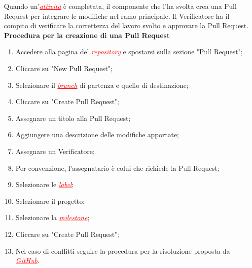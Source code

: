 Quando un'\textcolor{red}{\uline{\textit{attività}}} è completata, il componente che l'ha svolta crea una Pull Request per integrare le modifiche
nel ramo principale. Il Verificatore ha il compito di verificare la correttezza del lavoro svolto e approvare la Pull Request.
\textbf{Procedura per la creazione di una Pull Request} \label{pull_request}
\begin{enumerate}
    \item Accedere alla pagina del \textcolor{red}{\uline{\textit{repository}}} e spostarsi sulla sezione "Pull Request";
    \item Cliccare su "New Pull Request";
    \item Selezionare il \textcolor{red}{\uline{\textit{branch}}} di partenza e quello di destinazione;
    \item Cliccare su "Create Pull Request";
    \item Assegnare un titolo alla Pull Request;
    \item Aggiungere una descrizione delle modifiche apportate;
    \item Assegnare un Verificatore;
    \item Per convenzione, l'assegnatario è colui che richiede la Pull Request;
    \item Selezionare le \textcolor{red}{\uline{\textit{label}}};
    \item Selezionare il progetto;
    \item Selezionare la \textcolor{red}{\uline{\textit{milestone}}};
    \item Cliccare su "Create Pull Request";
    \item Nel caso di conflitti seguire la procedura per la risoluzione proposta da \textcolor{red}{\uline{\textit{GitHub}}}.
\end{enumerate}

